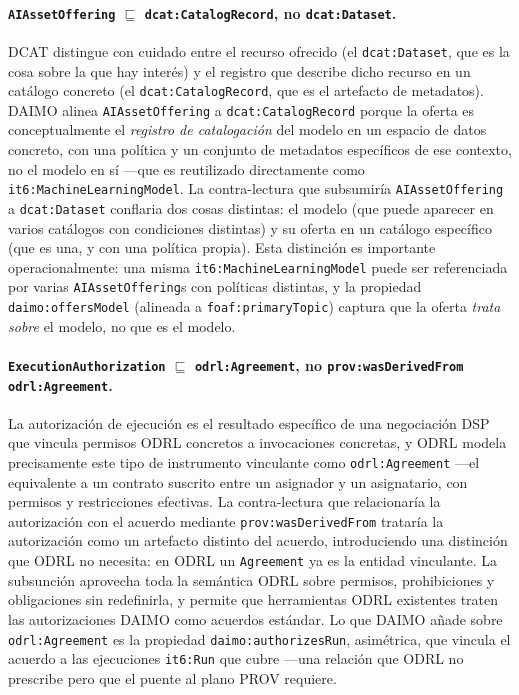 \documentclass[11pt,a4paper]{article}
\newcommand{\code}[1]{\texttt{#1}}
\begin{document}
\paragraph{\code{AIAssetOffering} $\sqsubseteq$ \code{dcat:CatalogRecord}, no \code{dcat:Dataset}.} DCAT distingue con cuidado entre el recurso ofrecido (el \code{dcat:Dataset}, que es la cosa sobre la que hay interés) y el registro que describe dicho recurso en un catálogo concreto (el \code{dcat:CatalogRecord}, que es el artefacto de metadatos). DAIMO alinea \code{AIAssetOffering} a \code{dcat:CatalogRecord} porque la oferta es conceptualmente el \emph{registro de catalogación} del modelo en un espacio de datos concreto, con una política y un conjunto de metadatos específicos de ese contexto, no el modelo en sí ---que es reutilizado directamente como \code{it6:MachineLearningModel}. La contra-lectura que subsumiría \code{AIAssetOffering} a \code{dcat:Dataset} conflaria dos cosas distintas: el modelo (que puede aparecer en varios catálogos con condiciones distintas) y su oferta en un catálogo específico (que es una, y con una política propia). Esta distinción es importante operacionalmente: una misma \code{it6:MachineLearningModel} puede ser referenciada por varias \code{AIAssetOffering}s con políticas distintas, y la propiedad \code{daimo:offersModel} (alineada a \code{foaf:primaryTopic}) captura que la oferta \emph{trata sobre} el modelo, no que es el modelo.

\paragraph{\code{ExecutionAuthorization} $\sqsubseteq$ \code{odrl:Agreement}, no \code{prov:wasDerivedFrom odrl:Agreement}.} La autorización de ejecución es el resultado específico de una negociación DSP que vincula permisos ODRL concretos a invocaciones concretas, y ODRL modela precisamente este tipo de instrumento vinculante como \code{odrl:Agreement} ---el equivalente a un contrato suscrito entre un asignador y un asignatario, con permisos y restricciones efectivas. La contra-lectura que relacionaría la autorización con el acuerdo mediante \code{prov:wasDerivedFrom} trataría la autorización como un artefacto distinto del acuerdo, introduciendo una distinción que ODRL no necesita: en ODRL un \code{Agreement} ya es la entidad vinculante. La subsunción aprovecha toda la semántica ODRL sobre permisos, prohibiciones y obligaciones sin redefinirla, y permite que herramientas ODRL existentes traten las autorizaciones DAIMO como acuerdos estándar. Lo que DAIMO añade sobre \code{odrl:Agreement} es la propiedad \code{daimo:authorizesRun}, asimétrica, que vincula el acuerdo a las ejecuciones \code{it6:Run} que cubre ---una relación que ODRL no prescribe pero que el puente al plano PROV requiere.
\end{document}

